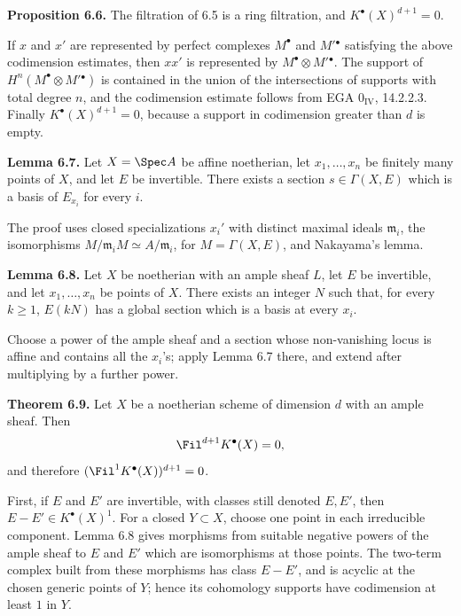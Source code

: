 \textbf{Proposition 6.6.} The filtration of 6.5 is a ring filtration, and \(K^\bullet(X)^{d+1}=0\).

If \(x\) and \(x'\) are represented by perfect complexes \(M^\bullet\) and \(M'{}^\bullet\) satisfying the above codimension estimates, then \(xx'\) is represented by \(M^\bullet\otimes M'{}^\bullet\). The support of \(H^n(M^\bullet\otimes M'{}^\bullet)\) is contained in the union of the intersections of supports with total degree \(n\), and the codimension estimate follows from EGA \(0_{\mathrm{IV}}\), 14.2.2.3. Finally \(K^\bullet(X)^{d+1}=0\), because a support in codimension greater than \(d\) is empty.

\textbf{Lemma 6.7.} Let \(X=\Spec A\) be affine noetherian, let \(x_1,\ldots,x_n\) be finitely many points of \(X\), and let \(E\) be invertible. There exists a section \(s\in \Gamma(X,E)\) which is a basis of \(E_{x_i}\) for every \(i\).

The proof uses closed specializations \(x_i'\) with distinct maximal ideals \(\mathfrak m_i\), the isomorphisms \(M/\mathfrak m_iM\simeq A/\mathfrak m_i\), for \(M=\Gamma(X,E)\), and Nakayama's lemma.

\textbf{Lemma 6.8.} Let \(X\) be noetherian with an ample sheaf \(L\), let \(E\) be invertible, and let \(x_1,\ldots,x_n\) be points of \(X\). There exists an integer \(N\) such that, for every \(k\geq1\), \(E(kN)\) has a global section which is a basis at every \(x_i\).

Choose a power of the ample sheaf and a section whose non-vanishing locus is affine and contains all the \(x_i\)'s; apply Lemma 6.7 there, and extend after multiplying by a further power.

\textbf{Theorem 6.9.} Let \(X\) be a noetherian scheme of dimension \(d\) with an ample sheaf. Then
\[
  \Fil^{d+1}K^\bullet(X)=0,
\]
and therefore \((\Fil^1K^\bullet(X))^{d+1}=0\).

First, if \(E\) and \(E'\) are invertible, with classes still denoted \(E,E'\), then \(E-E'\in K^\bullet(X)^1\). For a closed \(Y\subset X\), choose one point in each irreducible component. Lemma 6.8 gives morphisms from suitable negative powers of the ample sheaf to \(E\) and \(E'\) which are isomorphisms at those points. The two-term complex built from these morphisms has class \(E-E'\), and is acyclic at the chosen generic points of \(Y\); hence its cohomology supports have codimension at least \(1\) in \(Y\).

